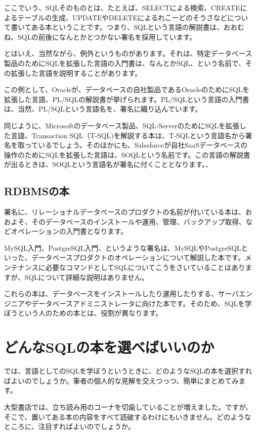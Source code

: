 ここでいう、SQLそのものとは、たとえば、SELECTによる検索、CREATEによるテーブルの生成、UPDATEやDELETEによるれこーどのそうさなどについて書いてある本ということです。つまり、SQLという言語の解説書は、おおむね、SQLの前後になんとかとつかない署名を採用しています。

とはいえ、当然ながら、例外というものがあります。それは、特定データベース製品のためにSQLを拡張した言語の入門書は、なんとかSQL、という名前で、その拡張した言語を説明することがあります。

この例として、Oracleが、データベースの自社製品であるOracleのためにSQLを拡張した言語、PL/SQLの解説書が挙げられます。PL/SQLという言語の入門書は、当然、PL/SQLという言語名を、署名に織り込んでいます。

同じように、Microsoftのデータベース製品、SQL-ServerのためにSQLを拡張した言語、Transaction SQL（T-SQL)を解説する本は、T-SQLという言語名から署名を取っているでしょう。そのほかにも、Salesforceが自社SaaSデータベースの操作のためにSQLを拡張した言語は、SOQLという名前です。この言語の解説書が出るときは、SOQLという言語名が署名に付くこととなります。、


\subsection{RDBMSの本}

署名に、リレーショナルデータベースのプロダクトの名前が付いている本は、おおよそ、そのデータベースのインストールや運用、管理、バックアップ取得、などオペレーションの入門書となります。

MySQL入門、PostgreSQL入門、というような署名は、MySQLやPostgreSQLといった、データベースプロダクトのオペレーションについて解説した本です。メンテナンスに必要なコマンドとしてSQLについてこうをさいていることはありますが、SQLについて詳細な説明はありません。

これらの本は、データベースをインストールしたり運用したりする、サーバエンジニアやデータベースアドミニストレータに向けた本です。そのため、SQLを学ぼうという人のための本とは、役割が異なります。


\section{どんなSQLの本を選べばいいのか}

では、言語としてのSQLを学ぼうというときに、どのようなSQLの本を選択すればよいのでしょうか。筆者の個人的な見解を交えつっつ、簡単にまとめてみます。

大型書店では、立ち読み用のコーナを切歯していることが増えました。ですが、そこで、置いてある本の内容をすべて読破するわけにもいきません。どのようなところに、注目すればよいのでしょうか。

